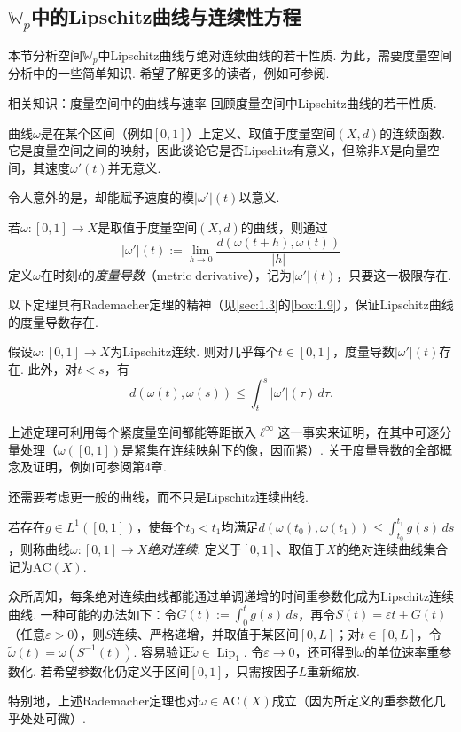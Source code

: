 \subsection[Wasserstein空间中的Lipschitz曲线与连续性方程]{$\mathbb W_p$中的Lipschitz曲线与连续性方程}\label{sec:5.3}

本节分析空间$\mathbb W_p$中Lipschitz曲线与绝对连续曲线的若干性质. 为此，需要度量空间分析中的一些简单知识. 希望了解更多的读者，例如可参阅\cite{b12}.

\begin{sourcebox}{相关知识：度量空间中的曲线与速率}\label{box:5.1}
回顾度量空间中Lipschitz曲线的若干性质.

曲线$\omega$是在某个区间（例如$[0,1]$）上定义、取值于度量空间$(X,d)$的连续函数. 它是度量空间之间的映射，因此谈论它是否Lipschitz有意义，但除非$X$是向量空间，其速度$\omega'(t)$并无意义.

令人意外的是，却能赋予速度的模$|\omega'|(t)$以意义.
\label{idx:root5-p187-metricderivative}
\begin{definition*}
若$\omega:[0,1]\to X$是取值于度量空间$(X,d)$的曲线，则通过\label{idx:root5-p188-metricformula}
\[
|\omega'|(t):=\lim_{h\to0}\frac{d(\omega(t+h),\omega(t))}{|h|}
\]
定义$\omega$在时刻$t$的\emph{度量导数}（metric derivative），记为$|\omega'|(t)$，只要这一极限存在.
\end{definition*}
以下定理具有Rademacher定理的精神（见\autoref{sec:1.3}的\autoref{box:1.9}），保证Lipschitz曲线的度量导数存在.
\begin{theorem*}
假设$\omega:[0,1]\to X$为Lipschitz连续. 则对几乎每个$t\in[0,1]$，度量导数$|\omega'|(t)$存在. 此外，对$t<s$，有
\[
d(\omega(t),\omega(s))\le\int_t^s|\omega'|(\tau)\,d\tau.
\]
\end{theorem*}
上述定理可利用每个紧度量空间都能等距嵌入$\ell^\infty$这一事实来证明，在其中可逐分量处理（$\omega([0,1])$是紧集在连续映射下的像，因而紧）. 关于度量导数的全部概念及证明，例如可参阅\cite{b12}第4章.

还需要考虑更一般的曲线，而不只是Lipschitz连续曲线.
\label{idx:root5-p188-ac}
\begin{definition*}
若存在$g\in L^1([0,1])$，使每个$t_0<t_1$均满足$d(\omega(t_0),\omega(t_1))\le\int_{t_0}^{t_1}g(s)\,ds$，则称曲线$\omega:[0,1]\to X$\emph{绝对连续}. 定义于$[0,1]$、取值于$X$的绝对连续曲线集合记为$\mathrm{AC}(X)$.
\end{definition*}
众所周知，每条绝对连续曲线都能通过单调递增的时间重参数化成为Lipschitz连续曲线. 一种可能的办法如下：令$G(t):=\int_0^t g(s)\,ds$，再令$S(t)=\varepsilon t+G(t)$（任意$\varepsilon>0$），则$S$连续、严格递增，并取值于某区间$[0,L]$；对$t\in[0,L]$，令$\widetilde\omega(t)=\omega(S^{-1}(t))$. 容易验证$\widetilde\omega\in\operatorname{Lip}_1$. 令$\varepsilon\to0$，还可得到$\omega$的单位速率重参数化. 若希望参数化仍定义于区间$[0,1]$，只需按因子$L$重新缩放.

特别地，上述Rademacher定理也对$\omega\in\mathrm{AC}(X)$成立（因为所定义的重参数化几乎处处可微）.
\end{sourcebox}

